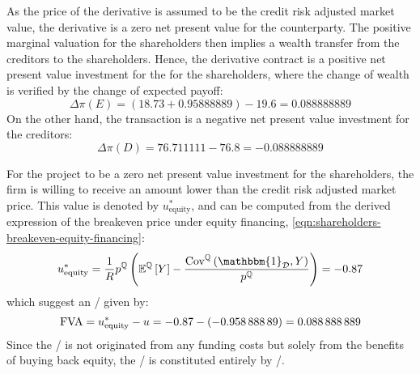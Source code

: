\documentclass[../main.tex]{subfiles}
\begin{document}
            As the price of the derivative is assumed to be the credit risk adjusted market value,
            the derivative is a zero net present value for the counterparty.
            The positive marginal valuation for the shareholders then implies a wealth transfer from the creditors to the shareholders.
            Hence, the derivative contract is a positive net present value investment for the for the shareholders, 
            where the change of wealth is verified by the change of expected payoff:
            \begin{equation}
                \Delta \pi(E) = (\num{18.73} + \num{0.95888889}) - \num{19.6} = \num{0.088888889}
            \end{equation}
            On the other hand, the transaction is a negative net present value investment for the creditors:
            \begin{equation}
                \Delta \pi(D) = \num{76.711111} - \num{76.8} = \num{-0.088888889}
            \end{equation}

            For the project to be a zero net present value investment for the shareholders,
            the firm is willing to receive an amount lower than the credit risk adjusted market price.
            This value is denoted by $u_{\text{equity}}^{\ast}$, and can be computed from the derived expression of the breakeven price under equity financing, \cref{eqn:shareholders-breakeven-equity-financing}:
            \begin{equation}
                u_{\text{equity}}^{\ast} =
                \discountfactor
                p^{\mathbb{Q}}
                \left(
                    \mathbb{E}^{\mathbb{Q}}\left[Y\right]
                    -
                    \frac{
                        \text{Cov}^{\mathbb{Q}}\left(\mathbbm{1}_{\mathcal{D}}, Y\right)
                    }{
                        p^{\mathbb{Q}}  
                    }  
                \right)
                = \num{-0.87}
            \end{equation}
            which suggest an \FVA/ given by:
            \begin{equation}
                \FVA/ =
                u_{\text{equity}}^{\ast} - u =
                \num{-0.87} - \left(\num{-0.95888889}\right) =
                \num{0.088888889}
            \end{equation}
            Since the \FVA/ is not originated from any funding costs but solely from the benefits of buying back equity,
            the \FVA/ is constituted entirely by \FBA/.
            
\end{document}
